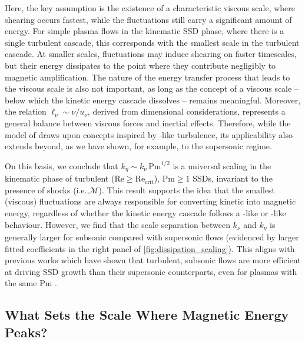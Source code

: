 \documentclass[12pt,twoside]{extreport}
\newcommand{\mReh}{\ensuremath{\mathrm{Re}}} %
\newcommand{\mPrm}{\ensuremath{\mathrm{Pm}}} %
\newcommand{\mSonicMach}{\ensuremath{\mathcal{M}}} %
\newcommand{\ie}{i.e.,\xspace} %
\begin{document}
Here, the key assumption is the existence of a characteristic viscous scale, where shearing occurs fastest, while the fluctuations still carry a significant amount of energy. For simple plasma flows in the kinematic SSD phase, where there is a single turbulent cascade, this corresponds with the smallest scale in the turbulent cascade. At smaller scales, fluctuations may induce shearing on faster timescales, but their energy dissipates to the point where they contribute negligibly to magnetic amplification. The nature of the energy transfer process that leads to the viscous scale is also not important, as long as the concept of a viscous scale -- below which the kinetic energy cascade dissolves -- remains meaningful. Moreover, the relation $\ell_\nu \sim \nu / u_\nu$, derived from dimensional considerations, represents a general balance between viscous forces and inertial effects. Therefore, while the model of \citet{schekochihin2002spectra} draws upon concepts inspired by \citet{kolmogorov1941dissipation}-like turbulence, its applicability also extends beyond, as we have shown, for example, to the supersonic regime.

On this basis, we conclude that \mbox{$k_\eta \sim k_\nu\, \mPrm^{1/2}$} is a universal scaling in the kinematic phase of turbulent ($\mReh \geq \mReh_\mathrm{crit}$), $\mPrm \geq 1$ SSDs, invariant to the presence of shocks (\ie $\mSonicMach$). This result supports the idea that the smallest (viscous) fluctuations are always responsible for converting kinetic into magnetic energy, regardless of whether the kinetic energy cascade follows a \citet{burgers1948_turbulence_model}-like or \citet{kolmogorov1941dissipation}-like behaviour. However, we find that the scale separation between $k_\nu$ and $k_\eta$ is generally larger for subsonic compared with supersonic flows (evidenced by larger fitted coefficients in the right panel of \autoref{fig:dissipation_scaling}). This aligns with previous works which have shown that turbulent, subsonic flows are more efficient at driving SSD growth than their supersonic counterparts, even for plasmas with the same $\mPrm$ \citep{schober2012magnetic}.

\subsection{What Sets the Scale Where Magnetic Energy Peaks?}
\label{sec:results:peak}
\end{document}
